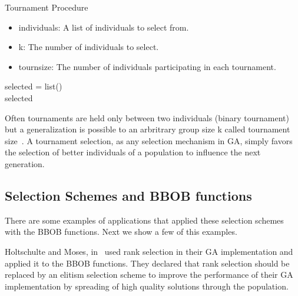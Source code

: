 \begin{algorithm}\label{tournament_procedure}
	\caption{Tournament Procedure}
	\tiny	\begin{itemize}
		\item individuals: A list of individuals to select from.\vspace{-3mm}
		\item k: The number of individuals to select.\vspace{-3mm}
		\item tournsize: The number of individuals participating in each tournament.\vspace{-3mm}
	\end{itemize}
	
	\normalsize
	
	\BlankLine
		
	selected = list()\\
	\return selected
\end{algorithm}



Often tournaments are held only between two individuals (binary tournament) but a generalization is possible to an arbritrary group size k called tournament size~\cite{blickle1995mathematical, goldberg1991comparative}. A tournament selection, as any selection mechanism in GA, simply favors the selection of better individuals of a population to influence the next generation. 


\subsection{Selection Schemes and BBOB functions}

There are some examples of applications that applied these selection schemes with the BBOB functions. Next we show a few of this examples.

Holtschulte and Moses, in~\cite{holtschulte2013benchmarking} used rank selection in their GA implementation and applied it to the BBOB functions. They declared that rank selection should be replaced by an elitism selection scheme to improve the performance of their GA implementation by spreading of high quality solutions through the population. 

